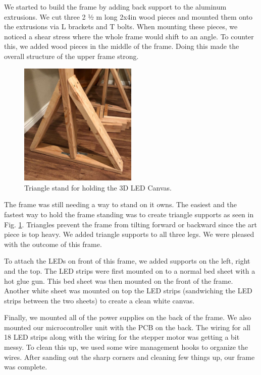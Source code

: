 \documentclass[12pt]{article}
\begin{document}
We started to build the frame by adding back support to the aluminum extrusions. We cut three 2 ½ m long 2x4in wood pieces and mounted them onto the extrusions via L brackets and T bolts. When mounting these pieces, we noticed a shear stress where the whole frame would shift to an angle. To counter this, we added wood pieces in the middle of the frame. Doing this made the overall structure of the upper frame strong.

\begin{figure}[H]
  \centering
  \includegraphics[width=0.5\textwidth]{image5.png}
  \caption{Triangle stand for holding the 3D LED Canvas.}
  \label{fig:framelegs}
\end{figure}

The frame was still needing a way to stand on it owns. The easiest and the fastest way to hold the frame standing was to create triangle supports as seen in Fig. \ref{fig:framelegs}. Triangles prevent the frame from tilting forward or backward since the art piece is top heavy. We added triangle supports to all three legs. We were pleased with the outcome of this frame.

To attach the LEDs on front of this frame, we added supports on the left, right and the top. The LED strips were first mounted on to a normal bed sheet with a hot glue gun. This bed sheet was then mounted on the front of the frame. Another white sheet was mounted on top the LED strips (sandwiching the LED strips between the two sheets) to create a clean white canvas.

Finally, we mounted all of the power supplies on the back of the frame. We also mounted our microcontroller unit with the PCB on the back. The wiring for all 18 LED strips along with the wiring for the stepper motor was getting a bit messy. To clean this up, we used some wire management hooks to organize the wires. After sanding out the sharp corners and cleaning few things up, our frame was complete.
\end{document}
